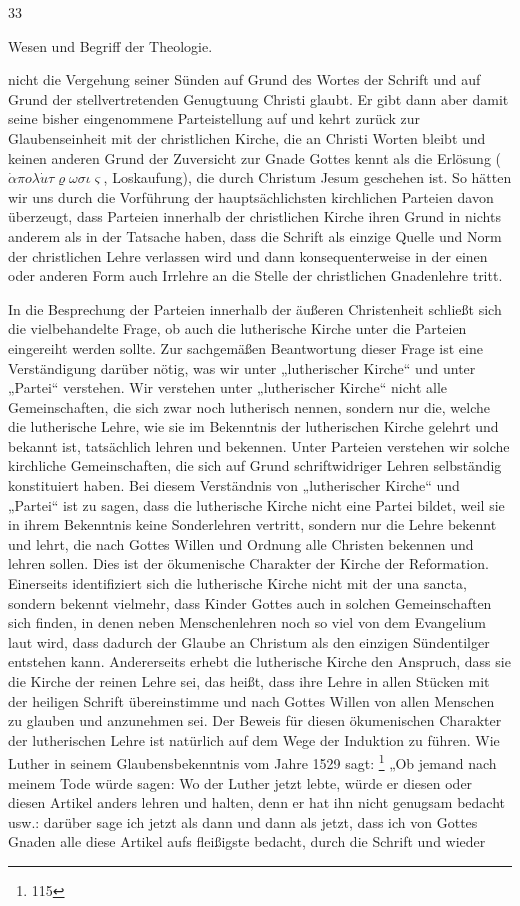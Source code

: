\hfill 33\par\centerline{Wesen und Begriff der Theologie.}\par nicht die Vergehung seiner Sünden auf Grund des Wortes der Schrift und auf Grund der stellvertretenden Genugtuung Christi glaubt. Er gibt dann aber damit seine bisher eingenommene Parteistellung auf und kehrt zurück zur Glaubenseinheit mit der christlichen Kirche, die an Christi Worten bleibt und keinen anderen Grund der Zuversicht zur Gnade Gottes kennt als die Erlösung ($\dot{\alpha}\pi o\lambda\dot{u}\tau\varrho\omega\sigma\iota\varsigma$, Loskaufung), die durch Christum Jesum geschehen ist. So hätten wir uns durch die Vorführung der hauptsächlichsten kirchlichen Parteien davon überzeugt, dass Parteien innerhalb der christlichen Kirche ihren Grund in nichts anderem als in der Tatsache haben, dass die Schrift als einzige Quelle und Norm der christlichen Lehre verlassen wird und dann konsequenterweise in der einen oder anderen Form auch Irrlehre an die Stelle der christlichen Gnadenlehre tritt.\par In die Besprechung der Parteien innerhalb der äußeren Christenheit schließt sich die vielbehandelte Frage, ob auch die lutherische Kirche unter die Parteien eingereiht werden sollte. Zur sachgemäßen Beantwortung dieser Frage ist eine Verständigung darüber nötig, was wir unter „lutherischer Kirche“ und unter „Partei“ verstehen. Wir verstehen unter „lutherischer Kirche“ nicht alle Gemeinschaften, die sich zwar noch lutherisch nennen, sondern nur die, welche die lutherische Lehre, wie sie im Bekenntnis der lutherischen Kirche gelehrt und bekannt ist, tatsächlich lehren und bekennen. Unter Parteien verstehen wir solche kirchliche Gemeinschaften, die sich auf Grund schriftwidriger Lehren selbständig konstituiert haben. Bei diesem Verständnis von „lutherischer Kirche“ und „Partei“ ist zu sagen, dass die lutherische Kirche nicht eine Partei bildet, weil sie in ihrem Bekenntnis keine Sonderlehren vertritt, sondern nur die Lehre bekennt und lehrt, die nach Gottes Willen und Ordnung alle Christen bekennen und lehren sollen. Dies ist der ökumenische Charakter der Kirche der Reformation. Einerseits identifiziert sich die lutherische Kirche nicht mit der una sancta, sondern bekennt vielmehr, dass Kinder Gottes auch in solchen Gemeinschaften sich finden, in denen neben Menschenlehren noch so viel von dem Evangelium laut wird, dass dadurch der Glaube an Christum als den einzigen Sündentilger entstehen kann. Andererseits erhebt die lutherische Kirche den Anspruch, dass sie die Kirche der reinen Lehre sei, das heißt, dass ihre Lehre in allen Stücken mit der heiligen Schrift übereinstimme und nach Gottes Willen von allen Menschen zu glauben und anzunehmen sei. Der Beweis für diesen ökumenischen Charakter der lutherischen Lehre ist natürlich auf dem Wege der Induktion zu führen. Wie Luther in seinem Glaubensbekenntnis vom Jahre 1529 sagt: \footnote{115} „Ob jemand nach meinem Tode würde sagen: Wo der Luther jetzt lebte, würde er diesen oder diesen Artikel anders lehren und halten, denn er hat ihn nicht genugsam bedacht usw.: darüber sage ich jetzt als dann und dann als jetzt, dass ich von Gottes Gnaden alle diese Artikel aufs fleißigste bedacht, durch die Schrift und wieder 